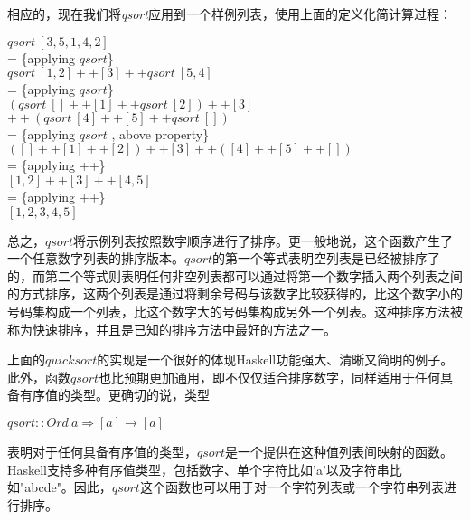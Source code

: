 相应的，现在我们将\textit{qsort}应用到一个样例列表，使用上面的定义化简计算过程：

\noindent\hspace*{1cm} $qsort~[3, 5, 1, 4, 2]$\\
\hspace*{1cm} = \{applying $qsort$\}\\
\hspace*{1cm} $qsort~[1, 2] ++ [3] ++ qsort~[5, 4]$\\
\hspace*{1cm} = \{applying $qsort$\}\\
\hspace*{1cm} $(qsort~[ ] ++ [1] ++ qsort~[2]) ++ [3]$\\
\hspace*{1cm} $++ (qsort~[4] ++ [5] ++ qsort~[ ])$\\
\hspace*{1cm} = \{applying $qsort$ , above property\}\\
\hspace*{1cm} $([ ] ++ [1] ++ [2]) ++ [3] ++ ([4] ++ [5] ++ [ ])$\\
\hspace*{1cm} = \{applying ++\}\\
\hspace*{1cm} $[1, 2] ++ [3] ++ [4, 5]$\\
\hspace*{1cm} = \{applying ++\}\\
\hspace*{1cm} $[1, 2, 3, 4, 5]$

总之，$qsort$将示例列表按照数字顺序进行了排序。更一般地说，这个函数产生了一个任意数字列表的排序版本。$qsort$的第一个等式表明空列表是已经被排序了的，而第二个等式则表明任何非空列表都可以通过将第一个数字插入两个列表之间的方式排序，这两个列表是通过将剩余号码与该数字比较获得的，比这个数字小的号码集构成一个列表，比这个数字大的号码集构成另外一个列表。这种排序方法被称为快速排序，并且是已知的排序方法中最好的方法之一。

上面的$quicksort$的实现是一个很好的体现Haskell功能强大、清晰又简明的例子。此外，函数$qsort$也比预期更加通用，即不仅仅适合排序数字，同样适用于任何具备有序值的类型。更确切的说，类型

\noindent\hspace*{1cm} $qsort::Ord~a \Rightarrow [a ] \rightarrow [a ]$

表明对于任何具备有序值的类型，$qsort$是一个提供在这种值列表间映射的函数。Haskell支持多种有序值类型，包括数字、单个字符比如'a'以及字符串比如"abcde"。因此，$qsort$这个函数也可以用于对一个字符列表或一个字符串列表进行排序。

